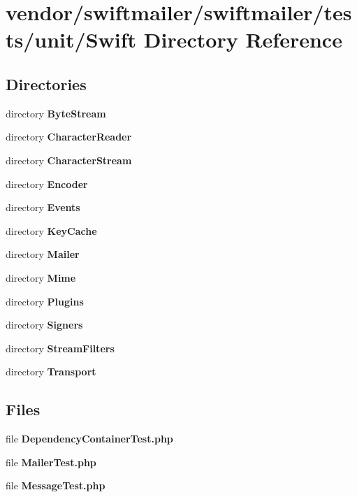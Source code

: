 \section{vendor/swiftmailer/swiftmailer/tests/unit/\+Swift Directory Reference}
\label{dir_ccc4d914a0c661e1b2a0db8baf543d25}
\subsection*{Directories}
\begin{DoxyCompactItemize}
\item 
directory {\bf Byte\+Stream}
\item 
directory {\bf Character\+Reader}
\item 
directory {\bf Character\+Stream}
\item 
directory {\bf Encoder}
\item 
directory {\bf Events}
\item 
directory {\bf Key\+Cache}
\item 
directory {\bf Mailer}
\item 
directory {\bf Mime}
\item 
directory {\bf Plugins}
\item 
directory {\bf Signers}
\item 
directory {\bf Stream\+Filters}
\item 
directory {\bf Transport}
\end{DoxyCompactItemize}
\subsection*{Files}
\begin{DoxyCompactItemize}
\item 
file {\bf Dependency\+Container\+Test.\+php}
\item 
file {\bf Mailer\+Test.\+php}
\item 
file {\bf Message\+Test.\+php}
\end{DoxyCompactItemize}
